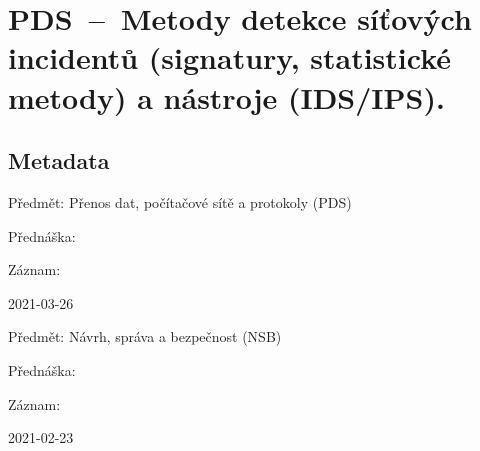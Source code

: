 

\graphicspath{{pds/detekce_sitovych_incidentu/figures}}


\chapter{PDS~--~Metody detekce síťových incidentů (signatury, statistické metody) a nástroje (IDS/IPS).}


\section{Metadata}

\begin{compactitem}
    \item Předmět: Přenos dat, počítačové sítě a protokoly (PDS)
    \item Přednáška:
    \begin{compactitem}
        \item {}
    \end{compactitem}
    \item Záznam:
    \begin{compactitem}
        \item 2021-03-26
    \end{compactitem}
\end{compactitem}

\begin{compactitem}
    \item Předmět: Návrh, správa a bezpečnost (NSB)
    \item Přednáška:
    \begin{compactitem}
        \item {}
    \end{compactitem}
    \item Záznam:
    \begin{compactitem}
        \item 2021-02-23
    \end{compactitem}
\end{compactitem}

